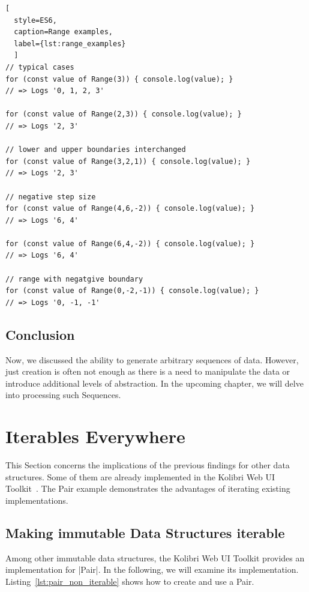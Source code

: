 \begin{lstlisting}[
  style=ES6, 
  caption=Range examples,
  label={lst:range_examples}
  ]
// typical cases
for (const value of Range(3)) { console.log(value); }
// => Logs '0, 1, 2, 3'

for (const value of Range(2,3)) { console.log(value); }
// => Logs '2, 3'

// lower and upper boundaries interchanged
for (const value of Range(3,2,1)) { console.log(value); }
// => Logs '2, 3'

// negative step size
for (const value of Range(4,6,-2)) { console.log(value); }
// => Logs '6, 4'

for (const value of Range(6,4,-2)) { console.log(value); }
// => Logs '6, 4'

// range with negatgive boundary
for (const value of Range(0,-2,-1)) { console.log(value); }
// => Logs '0, -1, -1'
\end{lstlisting}

\subsection{Conclusion}
\label{sub:iterable_protocol_Conclusion}
Now, we discussed the ability to generate arbitrary sequences of data. However, 
just creation is often not enough as there is a need to manipulate the data or 
introduce additional levels of abstraction. In the upcoming chapter, we will 
delve into processing such Sequences.

\section{Iterables Everywhere}
\label{sec:Iterables Everywhere}
This Section concerns the implications of the previous findings for other
data structures. Some of them are already implemented in the Kolibri Web UI
Toolkit~\cite{kolibri}. The Pair example demonstrates the advantages of 
iterating existing implementations.

\subsection{Making immutable Data Structures iterable}
\label{sub:Making immutable Data Structures iterable}
Among other immutable data structures, the Kolibri Web UI Toolkit provides an
implementation for |Pair|. In the following, we will examine its
implementation. Listing~\ref{lst:pair_non_iterable} shows how to create and use
a Pair.

